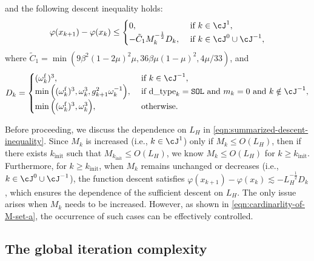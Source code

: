 \begin{lemma}
    and the following descent inequality holds:
    \begin{equation}
        \label{eqn:summarized-descent-inequality}
        \varphi(x_{k+1}) - \varphi(x_k) \leq 
         \begin{cases}
             0, & \text{ if } k \in \cJ^1, \\
             -\tilde C_1 M_k^{-\frac{1}{2}} D_k, & \text{ if } k \in \cJ^0 \cup \cJ^{-1},
        \end{cases}
    \end{equation}
    where
    $\tilde C_1 = \min\left( 9\beta^2(1 - 2\mu)^2\mu, 36\beta\mu(1-\mu)^2, 4\mu /33 \right)$, and
    \begin{equation}
        \label{eqn:summarized-descent-amount}
        D_k = \begin{cases}
            (\omega_k^{\supfallback})^3,
            & \text{ if } k \in \cJ^{-1}, \\
            \min\Big(  
                (\omega_k^{\supfallback})^3,
                \omega_k^3, 
                g_{k+1}^2 \omega_k^{-1}  
            \Big), & \text{ if } \text{d\_type}_k = \texttt{SOL} \text{ and } m_k = 0 \text{ and } k \notin \cJ^{-1}, 
            \\
            \min\Big( 
                (\omega_k^{\supfallback})^3,
                \omega_k^3
            \Big), & \text{ otherwise}.
        \end{cases}
    \end{equation}
\end{lemma}

Before proceeding, we discuss the dependence on $L_H$ in \eqref{eqn:summarized-descent-inequality}.
Since $M_k$ is increased (i.e., $k \in \cJ^{1}$) only if $M_k \leq O(L_H)$, 
then if there exists $k_{\mathrm{init}}$ such that $M_{k_{\mathrm{init}}} \le O(L_H)$, we know
$M_k \le O(L_H)$ for $k \geq k_{\mathrm{init}}$.
Furthermore, for $k \geq k_{\mathrm{init}}$, when $M_k$ remains unchanged or decreases (i.e., $k \in \cJ^0 \cup \cJ^{-1}$), 
the function descent satisfies $\varphi(x_{k+1}) - \varphi(x_k) \lesssim -L_H^{-\frac{1}{2}} D_k$,
which ensures the dependence of the sufficient descent on $L_H$. 
The only issue arises when $M_k$ needs to be increased. 
However, as shown in \eqref{eqn:cardinarlity-of-M-set-a},
the occurrence of such cases can be effectively controlled.

\subsection{The global iteration complexity}
\label{sec:main/sqrt-global-rate}

